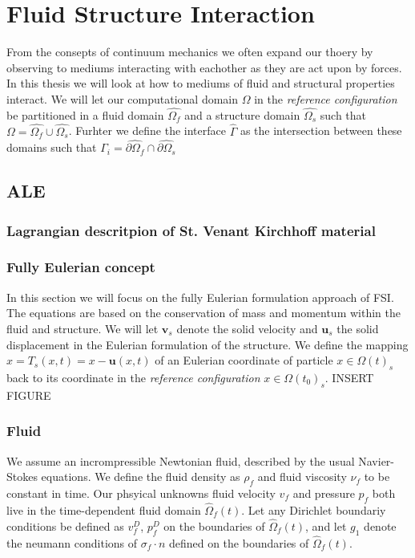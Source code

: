 \chapter{Fluid Structure Interaction}
From the consepts of continuum mechanics we often expand our thoery by observing to mediums interacting with eachother as they
are act upon by forces. In this thesis we will look at how to mediums of fluid and structural properties interact. We will let our computational domain $\Omega$ in the \textit{reference configuration} be partitioned in a fluid domain $\hat{\Omega_f}$ and a structure domain $\hat{\Omega_s}$ such that
$\Omega = \hat{\Omega_f} \cup \hat{\Omega_s}$. Furhter we define the interface $\hat{\Gamma}$ as the intersection between these domains such that $\Gamma_i = \hat{\partial \Omega_f} \cap \hat{\partial \Omega_s}$ \newline \newline

\section{ALE}

\subsection{Lagrangian descritpion of St. Venant Kirchhoff material}

\subsection{Fully Eulerian concept}
In this section we will focus on the fully Eulerian formulation approach of FSI. The equations are based on the conservation of mass and momentum within the fluid and structure.  
We will let $\textbf{v}_s$ denote the solid velocity and $\textbf{u}_s$ the solid displacement in the Eulerian formulation of the structure. We define the mapping $\hat{x} = T_s(x,t) = x - \textbf{u}(x,t)$ of an Eulerian coordinate of particle $x \in \Omega(t)_s$ back to its coordinate in the \textit{reference configuration} $x \in \Omega(t_0)_s$. \newline \newline INSERT FIGURE \newline 

\subsection{Fluid}
We assume an incrompressible Newtonian fluid, described by the usual Navier-Stokes equations. We define the fluid density as $\rho_f$ and fluid viscosity $\nu_f$ to be constant in time. Our phsyical unknowns
fluid velocity $v_f$ and pressure $p_f$ both live in the time-dependent fluid domain  $\hat{\Omega}_f(t)$. Let any Dirichlet boundariy conditions be defined as $v_f^D$, $p_f^D$ on the boundaries
of  $\hat{\Omega}_f(t)$, and let $g_1$ denote the neumann conditions of $\sigma_f \cdot n$ defined on the boundaries of $\hat{\Omega}_f(t)$.

